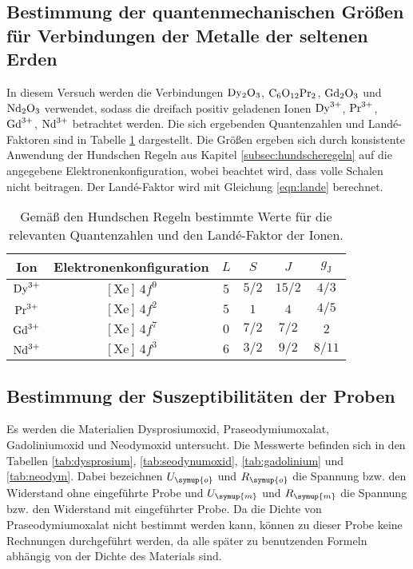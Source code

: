 \subsection{Bestimmung der quantenmechanischen Größen für Verbindungen der Metalle der seltenen Erden}
\label{subsec:quantenmechanik}

In diesem Versuch werden die Verbindungen $\ce{Dy2O3}$, $\ce{C6O12Pr2}$, $\ce{Gd2O3}$ und $\ce{Nd2O3}$ verwendet, sodass die dreifach positiv geladenen
Ionen $\ce{Dy^{3+}}$, $\ce{Pr^{3+}}$, $\ce{Gd^{3+}}$, $\ce{Nd^{3+}}$ betrachtet werden.
Die sich ergebenden Quantenzahlen und Landé-Faktoren sind in Tabelle \ref{tab:lsjg}
dargestellt. Die Größen ergeben sich durch konsistente Anwendung der Hundschen Regeln aus Kapitel \ref{subsec:hundscheregeln}
auf die angegebene Elektronenkonfiguration, wobei beachtet wird, dass volle Schalen nicht beitragen.
Der Landé-Faktor wird mit Gleichung \eqref{eqn:lande} berechnet.

\begin{table}[H]
\begin{center}
\caption{Gemäß den Hundschen Regeln bestimmte Werte für die relevanten Quantenzahlen und den Landé-Faktor der Ionen.}
\label{tab:lsjg}
\begin{tabular}{cccccc}
\toprule
Ion & Elektronenkonfiguration & $L$ & $S$ & $J$ & $g_{\text{J}}$\\
\midrule
$\ce{Dy^{3+}}$ & $[\text{Xe}] \, 4f^9$ & $5$ & $5/2$ & $15/2$ & $4/3$  \\
$\ce{Pr^{3+}}$ & $[\text{Xe}] \, 4f^2$ & $5$ & $1$   & $4$    & $4/5$  \\
$\ce{Gd^{3+}}$ & $[\text{Xe}] \, 4f^7$ & $0$ & $7/2$ & $7/2$  & $2$    \\
$\ce{Nd^{3+}}$ & $[\text{Xe}] \, 4f^3$ & $6$ & $3/2$ & $9/2$  & $8/11$ \\
\bottomrule
\end{tabular}
\end{center}
\end{table}

\subsection{Bestimmung der Suszeptibilitäten der Proben}
\label{subsec:suszept}

Es werden die Materialien Dysprosiumoxid, Praseodymiumoxalat, Gadoliniumoxid und
Neodymoxid untersucht. Die Messwerte befinden sich in den Tabellen \ref{tab:dysprosium},
\ref{tab:seodynumoxid}, \ref{tab:gadolinium} und \ref{tab:neodym}. Dabei bezeichnen
$U_{\symup{o}}$ und $R_{\symup{o}}$ die Spannung bzw. den Widerstand ohne eingeführte
Probe und $U_{\symup{m}}$ und $R_{\symup{m}}$ die Spannung bzw. den Widerstand mit
eingeführter Probe. Da die Dichte von Praseodymiumoxalat nicht bestimmt werden
kann, können zu dieser Probe keine Rechnungen durchgeführt werden, da alle später
zu benutzenden Formeln abhängig von der Dichte des Materials sind.


